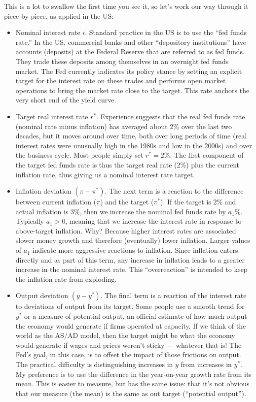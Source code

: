 \documentclass[letterpaper,12pt]{article}
\begin{document}
This is a lot to swallow the first time you see it,
so let's work our way through it piece by piece,
as applied in the US:
%
\begin{itemize}
\item Nominal interest rate $i$.
Standard practice in the US is to use the ``fed funds rate.''
In the US, commercial banks and other ``depository institutions'' have accounts (deposits) at the Federal Reserve that are referred to as fed funds.  They trade these deposits among themselves in an
overnight fed funds market.
The Fed currently indicates its policy stance by setting an explicit
target for the interest rate on these trades
and performs open market operations
to bring the market rate close to the target.
This rate anchors the very short end of the yield curve.

\item Target real interest rate $r^*$.  Experience suggests that the real fed funds rate (nominal
rate minus inflation) has averaged about 2\% over the last two decades, but it moves around over time, both over long periods of time
(real interest rates were unusually high in the 1980s
and low in the 2000s)
and over the business cycle.
Most people simply set $r^* = 2\%$.
The first component of the target fed funds rate is
thus the target real rate (2\%) plus the current inflation rate, thus giving us a nominal interest rate target.

\item Inflation deviation $(\pi - \pi^*)$.  The next term is a reaction to the difference between current inflation ($\pi$)
    and the target ($\pi^*$).
If the target is 2\% and actual inflation is 3\%, then we
increase the nominal fed funds rate by $a_1$\%.
Typically $a_1 > 0$, meaning that we increase the
interest rate in response to above-target inflation.
Why?  Because higher interest rates are associated slower money growth
and therefore (eventually) lower inflation.
Larger values of $a_1$ indicate more aggressive reactions to inflation.
Since inflation enters directly and as part of this term,
any increase in inflation leads to a greater increase in the nominal
interest rate.
This ``overreaction'' is intended to keep the inflation rate from exploding.

\item Output deviation $( y - y^*)$.
The final term is a reaction of the interest rate
to deviations of output from its target.
Some people use a smooth trend for $y^*$
or a measure of potential output,
an official estimate of how much output the economy would generate
if firms operated at capacity.
If we think of the world as the AS/AD model, then the target might be
what the economy would generate if wages and prices weren't sticky
--- whatever that is!
The Fed's goal, in this case,
is to offset the impact of those frictions on output.
The practical difficulty is distinguishing
increases in $y$ from increases in $y^*$.
My preference is to use the difference in the year-on-year
growth rate from its mean.
This is easier to measure,
but has the same issue:  that it's not obvious that our measure
(the mean) is the same as out target (``potential output'').



\end{itemize}
\end{document}
